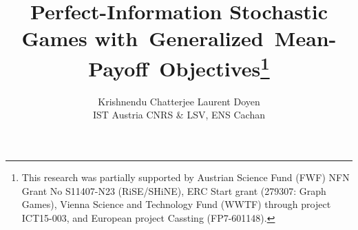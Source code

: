\documentclass{article}
\begin{document}
\sloppy



\title{{\bf Perfect-Information Stochastic Games \mbox{with Generalized Mean-Payoff Objectives}}\thanks{This research was partially supported by Austrian Science Fund (FWF) 
NFN Grant No S11407-N23 (RiSE/SHiNE), ERC Start grant (279307: Graph Games), 
Vienna Science and Technology Fund (WWTF) through project ICT15-003,
and European project Cassting (FP7-601148).
}}

\author{
Krishnendu Chatterjee \quad  Laurent Doyen \\ 
\normalsize
  IST Austria \quad  CNRS \& LSV, ENS Cachan 
}

\date{}
\maketitle


\begin{comment}
\title{Perfect-Information Stochastic Games with Generalized Mean-Payoff 
Objectives\thanks{This research was supported by Austrian Science Fund (FWF) 
NFN Grant No S11407-N23 (RiSE/SHiNE), ERC Start grant (279307: Graph Games), 
Vienna Science and Technology Fund (WWTF) through project ICT15-003,
and European project Cassting (FP7-601148).
}}

\authorinfo{Krishnendu Chatterjee}
{IST Austria} 
{krish.chat@ist.ac.at} 
\authorinfo{Laurent Doyen}
{LSV, ENS Cachan \& CNRS, France} 
{doyen@lsv.fr}
\end{comment}
\end{document}
